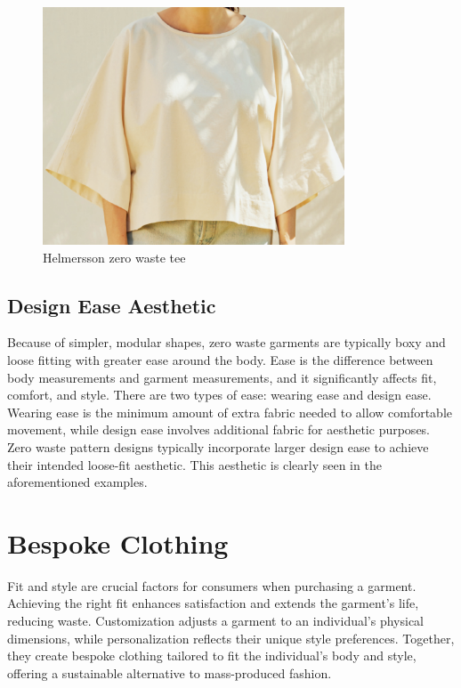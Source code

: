 \begin{figure} [H]
    \centering
    \includegraphics[width=0.8\textwidth]{Images/bh tee.png}
    \caption{Helmersson zero waste tee}
\end{figure}

\subsection{Design Ease Aesthetic}
Because of simpler, modular shapes, zero waste garments are typically boxy and loose fitting with greater ease around the body. Ease is the difference between body measurements and garment measurements, and it significantly affects fit, comfort, and style. There are two types of ease: wearing ease and design ease. Wearing ease is the minimum amount of extra fabric needed to allow comfortable movement, while design ease involves additional fabric for aesthetic purposes. Zero waste pattern designs typically incorporate larger design ease to achieve their intended loose-fit aesthetic. This aesthetic is clearly seen in the aforementioned examples.

\section{Bespoke Clothing}
Fit and style are crucial factors for consumers when purchasing a garment. Achieving the right fit enhances satisfaction and extends the garment's life, reducing waste. Customization adjusts a garment to an individual's physical dimensions, while personalization reflects their unique style preferences. Together, they create bespoke clothing tailored to fit the individual's body and style, offering a sustainable alternative to mass-produced fashion.

